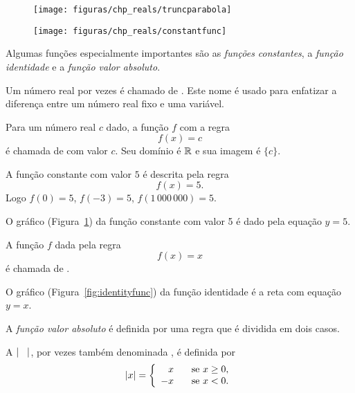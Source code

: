 \documentclass{svmono}
\begin{document}
\begin{figure}
\begin{minipage}[b]{1.754in}
\texttt{[image: figuras/chp\_reals/truncparabola]}
\caption{}
\label{fig:truncparabola}
\end{minipage}%
\hfill%
\begin{minipage}[b]{2.18in}
\texttt{[image: figuras/chp\_reals/constantfunc]}
\caption{}
\label{fig:constantfunc}
\end{minipage}
\end{figure}

Algumas funções especialmente importantes são as \emph{funções
constantes}, a \emph{função identidade} e a \emph{função valor
absoluto}.

Um número real por vezes é chamado de . Este
nome é usado para enfatizar a diferença entre um número real
fixo e uma variável.

Para um número real $c$ dado, a função $f$ com a regra
\[
  f(x) = c
\]
é chamada de  com
valor $c$. Seu domínio é $\mathbb{R}$ e sua imagem é $\{c\}$.

\begin{example}
\label{ex:constantfunc}
A função constante com valor $5$ é descrita pela regra
\[
  f(x) = 5.
\]
Logo \SPC $f(0) = 5$, \SPC $f(-3) = 5$, \SPC $f(1\,000\,000) = 5$.

O gráfico (Figura~\ref{fig:constantfunc}) da função constante com
valor 5 é dado pela equação $y=5$.
\end{example}

\begin{example}
\label{ex:identityfunc}
A função $f$ dada pela regra
\[
  f(x) = x
\]
é chamada de .

O gráfico (Figura~\ref{fig:identityfunc}) da função identidade é a
reta com equação $y=x$.
\end{example}


A \emph{função valor absoluto} é definida por uma regra que é
dividida em dois casos.

\begin{defin}
A  $|\hspace{2ex}|$,
por vezes também denominada , é
definida por
\[
  |x| = \left\{
        \begin{array}{rl}
         x & \hspace{2ex} \text{se } x \ge 0,\\
        -x & \hspace{2ex} \text{se } x < 0.
        \end{array}
        \right.
\]
\end{defin}
\end{document}
